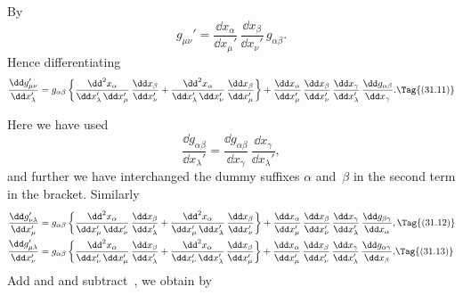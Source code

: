 \documentclass[12pt]{book}
\begin{document}

By~
\[
g_{\mu\nu}' = \frac{\dd x_{\alpha}}{\dd x_{\mu}'}\, \frac{\dd x_{\beta}}{\dd x_{\nu}'}\, g_{\alpha\beta}.
\]
Hence differentiating
\[
\frac{\dd g_{\mu\nu}'}{\dd x_{\lambda}'}
= g_{\alpha\beta} \left\{
    \frac{\dd^{2} x_{\alpha}}{\dd x_{\lambda}'\, \dd x_{\mu}'}\, \frac{\dd x_{\beta}}{\dd x_{\nu}'}
  + \frac{\dd^{2} x_{\alpha}}{\dd x_{\lambda}'\, \dd x_{\nu}'}\, \frac{\dd x_{\beta}}{\dd x_{\mu}'}\right\}
  + \frac{\dd x_{\alpha}}{\dd x_{\mu}'}\,
    \frac{\dd x_{\beta}}{\dd x_{\nu}'}\,
    \frac{\dd x_{\gamma}}{\dd x_{\lambda}'}\,
    \frac{\dd g_{\alpha\beta}}{\dd x_{\gamma}}.
\Tag{(31.11)}
\]

Here we have used
\[
\frac{\dd g_{\alpha\beta}}{\dd x_{\lambda}'}
= \frac{\dd g_{\alpha\beta}}{\dd x_{\gamma}}\, \frac{\dd x_{\gamma}}{\dd x_{\lambda}'},
\]
and further we have interchanged the dummy suffixes $\alpha$ and~$\beta$ in the second
term in the bracket. Similarly
\begin{align*}
  \frac{\dd g_{\nu\lambda}'}{\dd x_{\mu}'}
  &= g_{\alpha\beta} \left\{
    \frac{\dd^{2} x_{\alpha}}{\dd x_{\mu}'\, \dd x_{\nu}'}\, \frac{\dd x_{\beta}}{\dd x_{\lambda}'}
  + \frac{\dd^{2} x_{\alpha}}{\dd x_{\mu}'\, \dd x_{\lambda}'}\, \frac{\dd x_{\beta}}{\dd x_{\nu}'}\right\}
  + \frac{\dd x_{\alpha}}{\dd x_{\mu}'}\,
    \frac{\dd x_{\beta}}{\dd x_{\nu}'}\,
    \frac{\dd x_{\gamma}}{\dd x_{\lambda}'}\,
    \frac{\dd g_{\beta\gamma}}{\dd x_{\alpha}},
  \Tag{(31.12)} \\
  \frac{\dd g_{\mu\lambda}'}{\dd x_{\nu}'}
  &= g_{\alpha\beta} \left\{
    \frac{\dd^{2} x_{\alpha}}{\dd x_{\nu}'\, \dd x_{\mu}'}\, \frac{\dd x_{\beta}}{\dd x_{\lambda}'}
  + \frac{\dd^{2} x_{\alpha}}{\dd x_{\nu}'\, \dd x_{\lambda}'}\, \frac{\dd x_{\beta}}{\dd x_{\mu}'}\right\}
  + \frac{\dd x_{\alpha}}{\dd x_{\mu}'}\,
    \frac{\dd x_{\beta}}{\dd x_{\nu}'}\,
    \frac{\dd x_{\gamma}}{\dd x_{\lambda}'}\,
    \frac{\dd g_{\alpha\gamma}}{\dd x_{\beta}}.
\Tag{(31.13)}
\end{align*}
Add  and  and subtract~, we obtain by~
\end{document}
